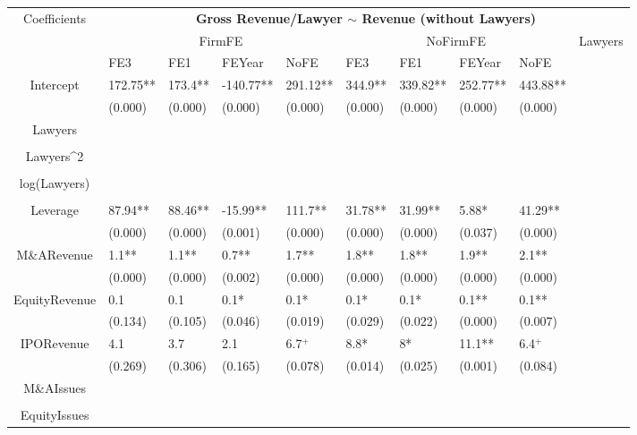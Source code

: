 \documentclass{article}
\begin{document}
\begin{table}[H]
\centering
\begin{tabular}{|clllllllll|}
\hline
\multirow{3}{*}{Coefficients} & \multicolumn{9}{c|}{\textbf{Gross Revenue/Lawyer $\sim$ Revenue (without Lawyers)}} \\
\cline{2-10}
& \multicolumn{4}{c}{FirmFE} & \multicolumn{4}{c}{NoFirmFE} & \multirow{2}{*}{Lawyers} \\
\cline{2-9}
& FE3 & FE1 & FEYear & NoFE & FE3 & FE1 & FEYear & NoFE &  \\
\hline
 
Intercept & 172.75** & 173.4** & -140.77** & 291.12** & 344.9** & 339.82** & 252.77** & 443.88** & \\ 
   & (0.000) & (0.000) & (0.000) & (0.000) & (0.000) & (0.000) & (0.000) & (0.000) & \\ 
  Lawyers &  &  &  &  &  &  &  &  & \\ 
   &  &  &  &  &  &  &  &  & \\ 
  Lawyers^2 &  &  &  &  &  &  &  &  & \\ 
   &  &  &  &  &  &  &  &  & \\ 
  log(Lawyers) &  &  &  &  &  &  &  &  & \\ 
   &  &  &  &  &  &  &  &  & \\ 
  Leverage & 87.94** & 88.46** & -15.99** & 111.7** & 31.78** & 31.99** & 5.88* & 41.29** & \\ 
   & (0.000) & (0.000) & (0.001) & (0.000) & (0.000) & (0.000) & (0.037) & (0.000) & \\ 
  M\&ARevenue & 1.1** & 1.1** & 0.7** & 1.7** & 1.8** & 1.8** & 1.9** & 2.1** & \\ 
   & (0.000) & (0.000) & (0.002) & (0.000) & (0.000) & (0.000) & (0.000) & (0.000) & \\ 
  EquityRevenue & 0.1 & 0.1 & 0.1* & 0.1* & 0.1* & 0.1* & 0.1** & 0.1** & \\ 
   & (0.134) & (0.105) & (0.046) & (0.019) & (0.029) & (0.022) & (0.000) & (0.007) & \\ 
  IPORevenue & 4.1 & 3.7 & 2.1 & 6.7$^{+}$ & 8.8* & 8* & 11.1** & 6.4$^{+}$ & \\ 
   & (0.269) & (0.306) & (0.165) & (0.078) & (0.014) & (0.025) & (0.001) & (0.084) & \\ 
  M\&AIssues &  &  &  &  &  &  &  &  & \\ 
   &  &  &  &  &  &  &  &  & \\ 
  EquityIssues &  &  &  &  &  &  &  &  & \\ 

\end{tabular}
\end{table}
\end{document}

